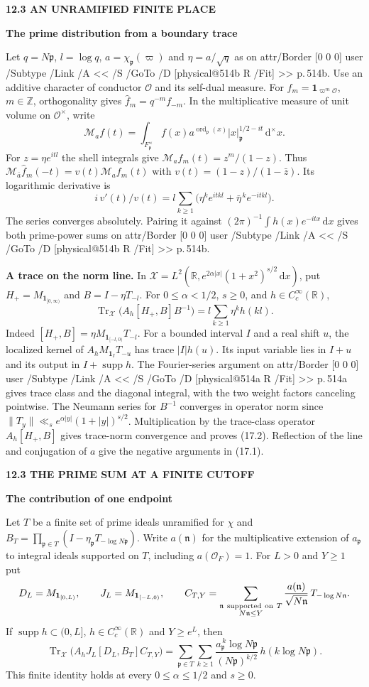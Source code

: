\documentclass[11pt,letterpaper]{article}
\makeatletter
\newcommand{\rightmarktext}{}
\newcommand{\printfolio}{}
\newcommand{\leaf}[4]{\clearpage\gdef\printfolio{#1}\gdef\rightmarktext{#2}%
  {\small\sffamily\bfseries\color{ink}#3\par}\vspace{3pt}%
  {\LARGE\bfseries #4\par}\vspace{5pt}}
\newcommand{\point}[1]{\par\smallskip\textbf{#1.}\enspace\ignorespaces}
\newcommand{\R}{\mathbb R}
\newcommand{\Z}{\mathbb Z}
\newcommand{\dd}{\,\mathrm d}
\DeclareMathOperator{\Tr}{Tr}
\DeclareMathOperator{\supp}{supp}
\newcommand{\MusicPDFPageRef}[1]{\pdfpageref\csname physical@#1\endcsname\space\space 0 R}
\newcommand{\pagelink}[2]{\leavevmode\pdfstartlink attr{/Border [0 0 0]} user{%
  /Subtype /Link /A << /S /GoTo /D [\MusicPDFPageRef{#1} /Fit] >>}%
  {\color{ink}#2}\pdfendlink}
\newcommand{\pg}[1]{\pagelink{#1}{p.\,#1}}
\makeatother
\begin{document}
\leaf{514c}{The local Fourier factor}{12.3 \quad AN UNRAMIFIED FINITE PLACE}{The prime distribution from a boundary trace}
Let $q=N\mathfrak p$, $l=\log q$, $a=\chi_{\mathfrak p}(\varpi)$ and
$\eta=a/\sqrt q$ as on \pg{514b}. Use an additive character of conductor
$\mathcal O$ and its self-dual measure. For $f_m=\mathbf1_{\varpi^m\mathcal O}$,
$m\in\Z$, orthogonality gives $\widehat f_m=q^{-m}f_{-m}$. In the
multiplicative measure of unit volume on $\mathcal O^\times$, write
\[
 \mathcal M_a f(t)=\int_{F_{\mathfrak p}^\times}
 f(x)a^{\operatorname{ord}_{\mathfrak p}(x)}|x|_{\mathfrak p}^{1/2-it}\dd^\times x .
\]
For $z=\eta e^{itl}$ the shell integrals give $\mathcal M_a f_m(t)=z^m/(1-z)$.
Thus $\mathcal M_{\bar a}\widehat f_m(-t)=v(t)\mathcal M_a f_m(t)$ with
$v(t)=(1-z)/(1-\bar z)$. Its logarithmic derivative is
\[
  i\,v'(t)/v(t)=l\sum_{k\ge1}
           \big(\eta^k e^{itkl}+\bar\eta^{\,k}e^{-itkl}\big).
 \tag{17.1}
\]
The series converges absolutely. Pairing it against
$(2\pi)^{-1}\int h(x)e^{-itx}\dd x$ gives both prime-power sums on \pg{514b}.

\point{A trace on the norm line}
In $\mathcal X=L^2(\R,e^{2\alpha|x|}(1+x^2)^{s/2}\dd x)$, put
$H_+=M_{\mathbf1_{[0,\infty)}}$ and $B=I-\eta T_{-l}$.
For $0\le\alpha<1/2$, $s\ge0$, and $h\in C_c^\infty(\R)$,
\[
 \Tr_{\mathcal X}\big(A_h[H_+,B]B^{-1}\big)
       =l\sum_{k\ge1}\eta^k h(kl).
 \tag{17.2}
\]
Indeed $[H_+,B]=\eta M_{\mathbf1_{[-l,0)}}T_{-l}$. For a bounded interval $I$
and a real shift $u$, the localized kernel of $A_h M_{\mathbf1_I}T_{-u}$
has trace $|I|h(u)$. Its input variable lies in $I+u$ and its output in
$I+\supp h$. The Fourier-series argument on \pg{514a} gives trace class
and the diagonal integral, with the two weight factors canceling pointwise.
The Neumann series for $B^{-1}$ converges in operator norm since
$\|T_y\|\ll_s e^{\alpha|y|}(1+|y|)^{s/2}$. Multiplication by the trace-class
operator $A_h[H_+,B]$ gives trace-norm convergence and proves (17.2).
Reflection of the line and conjugation of $a$ give the negative arguments in (17.1).

\leaf{514d}{A finite trace}{12.3 \quad THE PRIME SUM AT A FINITE CUTOFF}{The contribution of one endpoint}
Let $T$ be a finite set of prime ideals unramified for $\chi$ and
$B_T=\prod_{\mathfrak p\in T}(I-\eta_{\mathfrak p}T_{-\log N\mathfrak p})$.
Write $a(\mathfrak n)$ for the multiplicative extension of $a_{\mathfrak p}$
to integral ideals supported on $T$, including $a(\mathcal O_F)=1$.
For $L>0$ and $Y\ge1$ put
\[
 D_L=M_{\mathbf1_{[0,L)}},\qquad J_L=M_{\mathbf1_{[-L,0)}},\qquad
 C_{T,Y}=\sum_{\substack{\mathfrak n\ {\rm supported\ on}\ T\\N\mathfrak n\le Y}}
  \frac{a(\mathfrak n)}{\sqrt{N\mathfrak n}}\,T_{-\log N\mathfrak n}.
\]
If $\supp h\subset(0,L]$, $h\in C_c^\infty(\R)$ and $Y\ge e^L$, then
\[
 \Tr_{\mathcal X}\big(A_h J_L[D_L,B_T]C_{T,Y}\big)=
 \sum_{\mathfrak p\in T}\sum_{k\ge1}
  \frac{a_{\mathfrak p}^{\,k}\log N\mathfrak p}{(N\mathfrak p)^{k/2}}\,
               h(k\log N\mathfrak p).
 \tag{17.3}
\]
This finite identity holds at every $0\le\alpha\le1/2$ and $s\ge0$.
\end{document}
